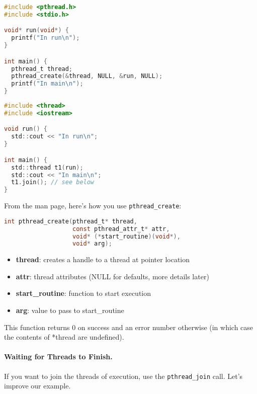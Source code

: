 {\small
  \begin{minipage}{.55\textwidth}
\begin{lstlisting}[language=C]
#include <pthread.h>
#include <stdio.h>

void* run(void*) {
  printf("In run\n");
}

int main() {
  pthread_t thread;
  pthread_create(&thread, NULL, &run, NULL);
  printf("In main\n");
}
\end{lstlisting}
  \end{minipage} 
  \begin{minipage}{.4\textwidth}
\begin{lstlisting}[language=C]
#include <thread>
#include <iostream>

void run() {
  std::cout << "In run\n";
}

int main() {
  std::thread t1(run);
  std::cout << "In main\n";
  t1.join(); // see below
}
\end{lstlisting}
  \end{minipage}
}

From the man page, here's how you use \verb+pthread_create+:
\begin{lstlisting}[language=C]
int pthread_create(pthread_t* thread, 
                   const pthread_attr_t* attr,
                   void* (*start_routine)(void*),
                   void* arg);
\end{lstlisting}

\begin{itemize}
\item  {\bf thread}: creates a handle to a thread at pointer location

\item  {\bf attr}: thread attributes (NULL for defaults, more details later)

\item  {\bf start\_routine}: function to start execution

\item   {\bf arg}: value to pass to start\_routine
\end{itemize}

This function returns 0 on success and an error number otherwise (in
which case the contents of *thread are undefined).

\paragraph{Waiting for Threads to Finish.} If you want to join the threads
of execution, use the {\tt pthread\_join} call. Let's improve our example.

